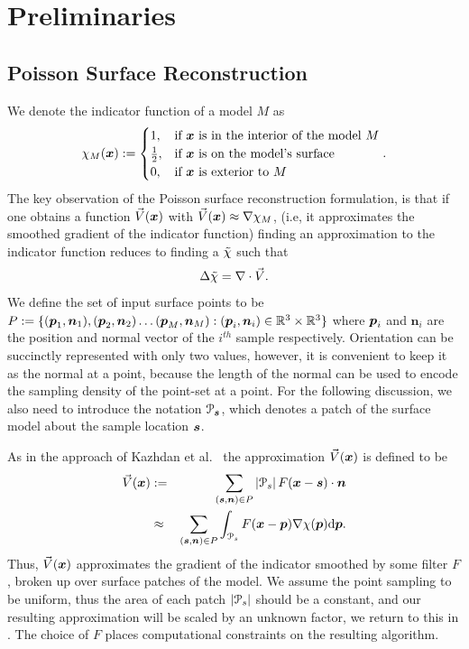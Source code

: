 \section{Preliminaries}
\label{sec:pois_review}
\subsection{Poisson Surface Reconstruction}
We denote the indicator function of a model $M$ as 
$$ \chi_M(\boldsymbol{x}) :=
	\begin{cases}
		1, & \text{if }\boldsymbol{x}\text{ is in the interior of the model } M \\
		\frac{1}{2}, & \text{if } \boldsymbol{x}\text{ is on the model's surface} \\
		0, & \text{if }\boldsymbol{x}\text{ is exterior to } M
	\end{cases}. 
$$
The key observation of the Poisson surface reconstruction formulation, is that if one obtains a function $\vec{V}(\boldsymbol{x})$ with $\vec{V}(\boldsymbol{x})\approx{\nabla}\chi_M$, (i.e, it approximates the smoothed gradient of the indicator function) finding an approximation to the indicator function reduces to finding a $\tilde{\chi}$ such that {\small 
\begin{equation} \label{eq:poisson}
	\lapl{\inda} = {\grad} \cdot \vec{V}.
\end{equation}}
We define the set of input surface points to be $P:=\{(\boldsymbol{p}_1,\boldsymbol{n}_1), (\boldsymbol{p}_2,\boldsymbol{n}_2) \hdots (\boldsymbol{p}_M,\boldsymbol{n}_M) : (\boldsymbol{p}_i,\boldsymbol{n}_i) \in \mathbb{R}^3 \times \mathbb{R}^3 \}$ where $\boldsymbol{p}_i$ and $\mathbf{n}_i$ are the position and normal vector of the $i^{th}$ sample respectively. 
Orientation can be succinctly represented with only two values, however, it is convenient to keep it as the normal at a point, because the length of the normal can be used to encode the sampling density of the point-set at a point. 
For the following discussion, we also need to introduce the notation $\mathcal{P}_{\boldsymbol{s}}$, which denotes a patch of the surface model about the sample location $\boldsymbol{s}$. 

As in the approach of Kazhdan et al.~\cite{Kazhdan06} the approximation $\vec{V}(\boldsymbol{x})$ is defined to be  {\small 
\begin{eqnarray}
	\vec{V}(\vx) & := & \sum_{(\vect{s},\vect{n}) \in P}\left|\patch_s\right|F(\vx-\vect{s})\cdot\vn \label{eq:vdef} \\
	 & \approx & \sum_{(\vect{s},\vect{n}) \in P} \int_{\patch_s}{F(\vect{x} - \vect{p}) \nabla \chi (\vect{p})} \mathrm{d} \vect{p}. \notag  
\end{eqnarray}}
Thus, $\vec{V}(\boldsymbol{x})$ approximates the gradient of the indicator smoothed by some filter $F$, broken up over surface patches of the model. 
We assume the point sampling to be uniform, thus the area of each patch $\left|\mathcal{P}_s\right|$ should be a constant, and our resulting approximation will be scaled by an unknown factor, we return to this in . 
The choice of $F$ places computational constraints on the resulting algorithm.

